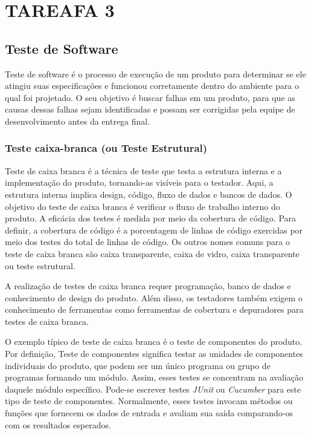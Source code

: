 
\chapter{TAREAFA 3}
\label{sec:tarefa3}

\section{Teste de Software}

Teste de software é o processo de execução de um produto para determinar se ele atingiu suas especificações e funcionou corretamente dentro do ambiente para o qual foi projetado.
O seu objetivo é buscar falhas em um produto, para que as causas dessas falhas sejam identificadas e possam ser corrigidas pela equipe de desenvolvimento antes da entrega final.

\subsection{Teste caixa-branca (ou Teste Estrutural)}

Teste de caixa branca é a técnica de teste que testa a estrutura interna e a implementação do produto, tornando-as visíveis para o testador. Aqui, a estrutura interna implica design, código, fluxo de dados e bancos de dados. O objetivo do teste de caixa branca é verificar o fluxo de trabalho interno do produto. A eficácia dos testes é medida por meio da cobertura de código. Para definir, a cobertura de código é a porcentagem de linhas de código exercidas por meio dos testes do total de linhas de código. Os outros nomes comuns para o teste de caixa branca são caixa transparente, caixa de vidro, caixa transparente ou teste estrutural.

A realização de testes de caixa branca requer programação, banco de dados e conhecimento de design do produto. Além disso, os testadores também exigem o conhecimento de ferramentas como ferramentas de cobertura e depuradores para testes de caixa branca.

O exemplo típico de teste de caixa branca é o teste de componentes do produto. Por definição, Teste de componentes significa testar as unidades de componentes individuais do produto, que podem ser um único programa ou grupo de programas formando um módulo. Assim, esses testes se concentram na avaliação daquele módulo específico. Pode-se escrever testes \textit{JUnit} ou \textit{Cucumber} para este tipo de teste de componentes. Normalmente, esses testes invocam métodos ou funções que fornecem os dados de entrada e avaliam sua saída comparando-os com os resultados esperados.

